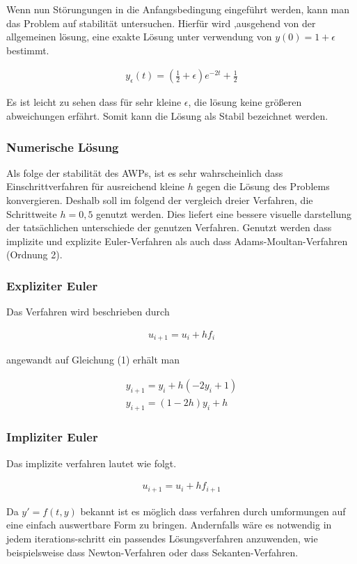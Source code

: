 \documentclass{article}
\newcommand\Section[1]{ %
  \addtocontents{toc}{\protect\setcounter{tocdepth}{0}}
  \subsubsection*{#1}
  \addtocontents{toc}{\protect\setcounter{tocdepth}{3}}}
\begin{document}
			Wenn nun Störungungen in die Anfangsbedingung eingeführt werden, kann man das Problem auf stabilität untersuchen. Hierfür wird
			,ausgehend von der allgemeinen lösung, eine exakte Lösung unter verwendung von $y(0) = 1 + \epsilon$ bestimmt.
			
			\begin{align*}
				y_{\epsilon}(t) = (\frac{1}{2} + \epsilon)e^{-2t} + \frac{1}{2}
			\end{align*}
			
			Es ist leicht zu sehen dass für sehr kleine $\epsilon$, die lösung keine größeren abweichungen erfährt.
			Somit kann die Lösung als Stabil bezeichnet werden. 
			
		\subsubsection{Numerische Lösung}
		
			Als folge der stabilität des AWPs, ist es sehr wahrscheinlich dass Einschrittverfahren für ausreichend kleine $h$ gegen die Lösung des Problems konvergieren. Deshalb soll im folgend der vergleich dreier Verfahren, die Schrittweite $h=0,5$ genutzt werden. Dies liefert eine bessere visuelle darstellung der tatsächlichen unterschiede der genutzen Verfahren. Genutzt werden dass implizite und explizite Euler-Verfahren als auch dass Adams-Moultan-Verfahren (Ordnung 2).
			
			\Section{Expliziter Euler}
			
				Das Verfahren wird beschrieben durch
				
				\begin{align*}
					u_{i+1} = u_{i} + hf_{i}
				\end{align*}
				
				angewandt auf Gleichung (1) erhält man
				
				\begin{align*}
					y_{i+1} = y_{i} + h(-2y_{i}+1) \\
					y_{i+1} = (1-2h)y_{i} + h
				\end{align*}
			
			\Section{Impliziter Euler}
			
				Das implizite verfahren lautet wie folgt.
				
				\begin{align*}
					u_{i+1} = u_{i} + hf_{i+1}
				\end{align*}
				
				Da $y' = f(t, y)$ bekannt ist es möglich dass verfahren durch umformungen auf eine einfach
				auswertbare Form zu bringen. Andernfalls wäre es notwendig in jedem iterations-schritt ein passendes
				Lösungsverfahren anzuwenden, wie beispielsweise dass Newton-Verfahren oder dass Sekanten-Verfahren.
				
\end{document}
